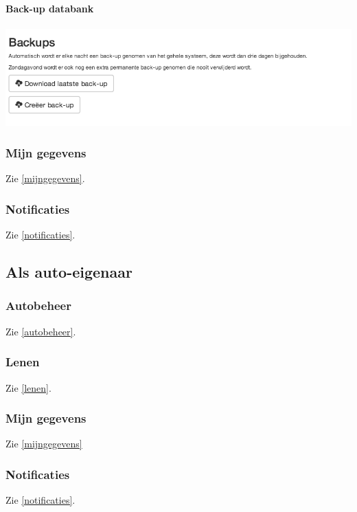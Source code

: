 \documentclass[11pt,a4paper,oneside]{article}
\begin{document}
{\large{\textbf{Back-up databank}}} \\\\
\includegraphics{backups} \\
\subsubsection{Mijn gegevens}
Zie \ref{mijngegevens}.
\subsubsection{Notificaties}
Zie \ref{notificaties}.



\subsection{Als auto-eigenaar}
\subsubsection{Autobeheer}
Zie \ref{autobeheer}.
\subsubsection{Lenen}
Zie \ref{lenen}.
\subsubsection{Mijn gegevens}
Zie \ref{mijngegevens}
\subsubsection{Notificaties}
Zie \ref{notificaties}.
\end{document}
